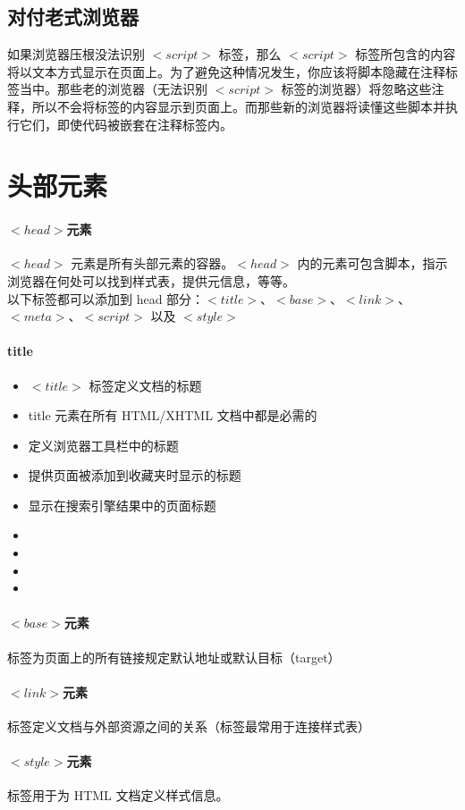 \documentclass[10pt,UTF8]{ctexart}
\begin{document}
\subsection{对付老式浏览器}
如果浏览器压根没法识别 $<script>$ 标签，那么 $<script>$ 标签所包含的内容将以文本方式显示在页面上。为了避免这种情况发生，你应该将脚本隐藏在注释标签当中。那些老的浏览器（无法识别 $<script>$ 标签的浏览器）将忽略这些注释，所以不会将标签的内容显示到页面上。而那些新的浏览器将读懂这些脚本并执行它们，即使代码被嵌套在注释标签内。

\section{头部元素}
\paragraph{$<head>$元素} $<head>$ 元素是所有头部元素的容器。$<head>$ 内的元素可包含脚本，指示浏览器在何处可以找到样式表，提供元信息，等等。\\
以下标签都可以添加到 head 部分：$<title>$、$<base>$、$<link>$、$<meta>$、$<script>$ 以及 $<style>$
\paragraph{title}
\begin{itemize}
\item $<title>$ 标签定义文档的标题
\item title 元素在所有 HTML/XHTML 文档中都是必需的
\item 定义浏览器工具栏中的标题
\item 提供页面被添加到收藏夹时显示的标题
\item 显示在搜索引擎结果中的页面标题
\item
\item
\item
\item
\end{itemize}
\paragraph{$<base>$元素} 标签为页面上的所有链接规定默认地址或默认目标（target）
\paragraph{$<link>$元素} 标签定义文档与外部资源之间的关系（标签最常用于连接样式表）
\paragraph{$<style>$元素} 标签用于为 HTML 文档定义样式信息。
\end{document}
